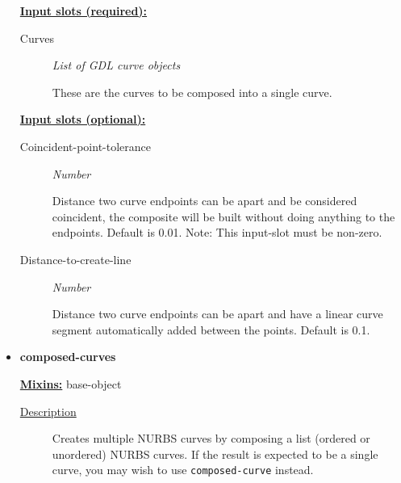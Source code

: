 \documentclass [11pt]{book}
\begin{document}
\begin{itemize}
\textbf{
\underline{Input slots (required):}}

\begin{description}

\item [Curves]
\emph{List of GDL curve objects}

 These are the curves to be composed into a single curve.




\end{description}






\textbf{
\underline{Input slots (optional):}}

\begin{description}

\item [Coincident-point-tolerance]
\emph{Number}

 Distance two curve endpoints can be apart and be considered coincident, the composite will be built
without doing anything to the endpoints. Default is 0.01. Note: This input-slot must be non-zero.




\item [Distance-to-create-line]
\emph{Number}

 Distance two curve endpoints can be apart and have a linear curve segment automatically added between the points. Default is 0.1.




\end{description}







\item {}
\label{prim:composed-curves}
\textbf{composed-curves}


\textbf{
\underline{Mixins:}} base-object





\begin{description}

\item [
\underline{Description}]


Creates multiple NURBS curves by composing a list (ordered or unordered) NURBS curves. 
If the result is expected to be a single curve, you may wish to use \texttt{composed-curve} instead.




\end{description}
\end{itemize}
\end{document}
